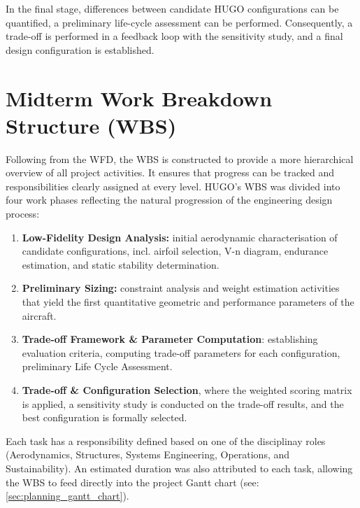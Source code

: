 In the final stage, differences between candidate HUGO configurations can be quantified, a preliminary life-cycle assessment can be performed. Consequently, a trade-off is performed in a feedback loop with the sensitivity study, and a final design configuration is established. %


\section{Midterm Work Breakdown Structure (WBS)}
\label{sec:planning_WBS}

Following from the WFD, the WBS is constructed to provide a more hierarchical overview of all project activities. %
It ensures that progress can be tracked and responsibilities clearly assigned at every level. HUGO's WBS was divided into four work phases reflecting the natural progression of the engineering design process:

\begin{enumerate}
    \item \textbf{Low-Fidelity Design Analysis:} initial aerodynamic characterisation of candidate configurations, incl. airfoil selection, V-n diagram, endurance estimation, and static stability determination.
    
    \item \textbf{Preliminary Sizing:} constraint analysis and weight estimation activities that yield the first quantitative geometric and performance parameters of the aircraft.

    \item \textbf{Trade-off Framework \& Parameter Computation}: establishing evaluation criteria, computing trade-off parameters for each configuration, preliminary Life Cycle Assessment.

    \item \textbf{Trade-off \& Configuration Selection}, where the weighted scoring matrix is applied, a sensitivity study is conducted on the trade-off results, and the best configuration is formally selected.
\end{enumerate}

Each task has a responsibility defined based on one of the disciplinay roles (Aerodynamics, Structures, Systems Engineering, Operations, and Sustainability). An estimated duration was also attributed to each task, allowing the WBS to feed directly into the project Gantt chart (see: \autoref{sec:planning_gantt_chart}).


